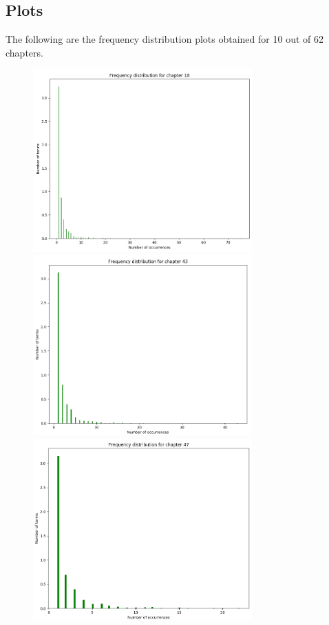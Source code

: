 \documentclass{article}
\begin{document}
\subsection{Plots}
\begin{flushleft}
	The following are the frequency distribution plots obtained for 10 out of 62 chapters. 
	\begin{figure}[H]
		\begin{minipage}{0.45\linewidth}
			\centering
			\includegraphics[width=0.75\textwidth]{./images/1-chapter_wise-frequency.png}
			\includegraphics[width=0.75\textwidth]{./images/2-chapter_wise-frequency.png}
			\includegraphics[width=0.75\textwidth]{./images/3-chapter_wise-frequency.png}

\end{minipage}
\end{figure}
\end{flushleft}
\end{document}
